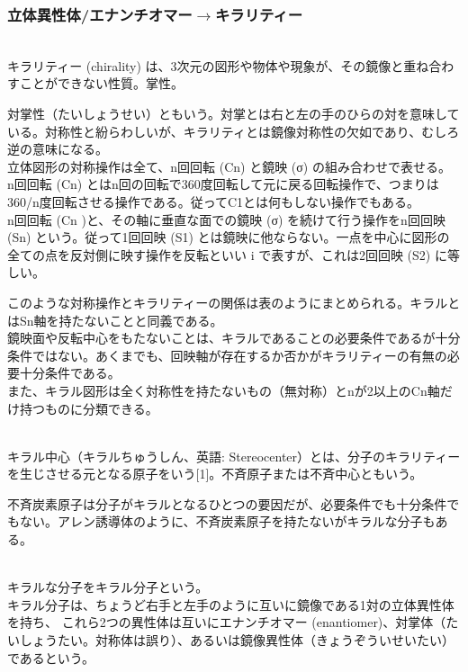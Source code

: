 \documentclass[dvipdfmx,uplatex,twocolumn,10pt]{jsarticle}
\begin{document}
\subsubsection{立体異性体/エナンチオマー$\rightarrow$キラリティー}
\begin{defi} \mbox{} \\
キラリティー (chirality) は、3次元の図形や物体や現象が、その鏡像と重ね合わすことができない性質。掌性。 \\
\end{defi}
対掌性（たいしょうせい）ともいう。対掌とは右と左の手のひらの対を意味している。対称性と紛らわしいが、キラリティとは鏡像対称性の欠如であり、むしろ逆の意味になる。 \\
立体図形の対称操作は全て、n回回転 (Cn) と鏡映 (σ) の組み合わせで表せる。 \\
n回回転 (Cn) とはn回の回転で360度回転して元に戻る回転操作で、つまりは360/n度回転させる操作である。従ってC1とは何もしない操作でもある。 \\
n回回転 (Cn )と、その軸に垂直な面での鏡映 (σ) を続けて行う操作をn回回映 (Sn) という。従って1回回映 (S1) とは鏡映に他ならない。一点を中心に図形の全ての点を反対側に映す操作を反転といい i で表すが、これは2回回映 (S2) に等しい。

このような対称操作とキラリティーの関係は表のようにまとめられる。キラルとはSn軸を持たないことと同義である。 \\
鏡映面や反転中心をもたないことは、キラルであることの必要条件であるが十分条件ではない。あくまでも、回映軸が存在するか否かがキラリティーの有無の必要十分条件である。 \\
また、キラル図形は全く対称性を持たないもの（無対称）とnが2以上のCn軸だけ持つものに分類できる。 \\

\begin{defi} \mbox{} \\
キラル中心（キラルちゅうしん、英語: Stereocenter）とは、分子のキラリティーを生じさせる元となる原子をいう[1]。不斉原子または不斉中心ともいう。 \\
\end{defi}
不斉炭素原子は分子がキラルとなるひとつの要因だが、必要条件でも十分条件でもない。アレン誘導体のように、不斉炭素原子を持たないがキラルな分子もある。 \\

\begin{defi} \mbox{} \\
キラルな分子をキラル分子という。 \\
キラル分子は、ちょうど右手と左手のように互いに鏡像である1対の立体異性体を持ち、
これら2つの異性体は互いにエナンチオマー (enantiomer)、対掌体（たいしょうたい。対称体は誤り）、あるいは鏡像異性体（きょうぞういせいたい）であるという。 \\
\end{defi}
\end{document}
